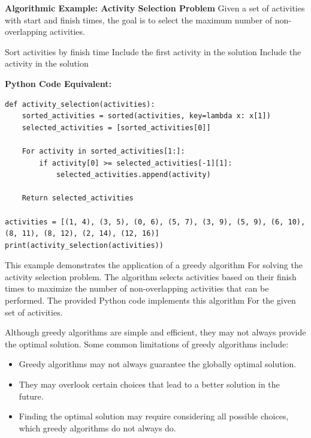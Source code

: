 \documentclass[12pt]{book} %
\begin{document}
\textbf{Algorithmic Example: Activity Selection Problem}
\FloatBarrier
Given a set of activities with start and finish times, the goal is to select the maximum number of non-overlapping activities.
\FloatBarrier
\begin{algorithm}
\caption{Activity Selection Problem}
\begin{algorithmic}[1]
\State Sort activities by finish time
\State Include the first activity in the solution
        \State Include the activity in the solution
    \EndIf
\EndFor
\end{algorithmic}
\end{algorithm}
\FloatBarrier
\textbf{Python Code Equivalent:}
\begin{lstlisting}
def activity_selection(activities):
    sorted_activities = sorted(activities, key=lambda x: x[1])
    selected_activities = [sorted_activities[0]]
    
    For activity in sorted_activities[1:]:
        if activity[0] >= selected_activities[-1][1]:
            selected_activities.append(activity)
    
    Return selected_activities

activities = [(1, 4), (3, 5), (0, 6), (5, 7), (3, 9), (5, 9), (6, 10), (8, 11), (8, 12), (2, 14), (12, 16)]
print(activity_selection(activities)) 
\end{lstlisting}
\FloatBarrier
This example demonstrates the application of a greedy algorithm For solving the activity selection problem. The algorithm selects activities based on their finish times to maximize the number of non-overlapping activities that can be performed. The provided Python code implements this algorithm For the given set of activities.


Although greedy algorithms are simple and efficient, they may not always provide the optimal solution. Some common limitations of greedy algorithms include:
\begin{itemize}
    \item Greedy algorithms may not always guarantee the globally optimal solution.
    \item They may overlook certain choices that lead to a better solution in the future.
    \item Finding the optimal solution may require considering all possible choices, which greedy algorithms do not always do.
\end{itemize}
\end{document}
